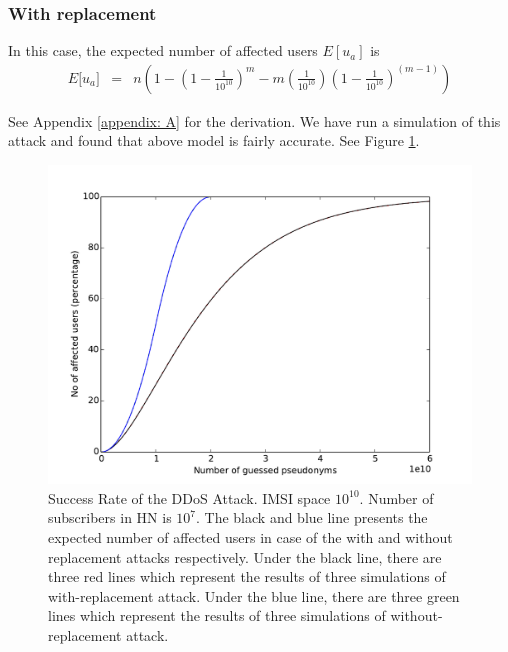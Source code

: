 \documentclass{llncs} %
\begin{document}
\subsubsection{With replacement}
In this case, the expected number of affected users $E[u_a]$ is
\begin{eqnarray}
E\big[ u_a \big] &=& n\left(1- \left(1 - \frac{1}{10^{10}}\right)^m - m\left(\frac{1}{10^{10}}\right)\left(1 - \frac{1}{10^{10}}\right)^{\left(m-1 \right)} \right)
\end{eqnarray} 

See Appendix \ref{appendix: A} for the derivation. We have run a simulation of this attack and found that above model is fairly accurate. See Figure \ref{fig:simulation_and_modeling}.

\begin{figure}[]
  \centering
    \includegraphics[width=\textwidth]{sim_and_mod.pdf}
  \caption{Success Rate of the DDoS Attack. IMSI space $10^{10}$. Number of subscribers in HN is $10^7$. The black and blue line presents the expected number of affected users in case of the with and without replacement attacks respectively. Under the black line, there are three red lines which represent the results of three simulations of with-replacement attack. Under the blue line, there are three green lines which represent the results of three simulations of without-replacement attack.}
  \label{fig:simulation_and_modeling}	
\end{figure}
\end{document}
